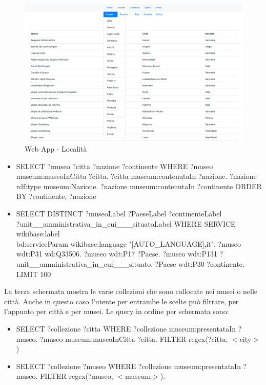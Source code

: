 \documentclass[12pt]{article}
\begin{document}
\begin{figure}[!h]
   \centering
   \includegraphics[scale=0.30]{fig/Schermata 2 webapp.png}
   \caption{Web App - Località}\label{fig:picture}
\end{figure}

\begin{itemize}
 \item SELECT ?museo ?citta ?nazione ?continente WHERE {?museo museum:museoInCitta ?citta. ?citta museum:contenutaIn ?nazione. ?nazione rdf:type museum:Nazione. ?nazione museum:contenutaIn ?continente} ORDER BY ?continente, ?nazione
 \item SELECT DISTINCT ?museoLabel ?PaeseLabel ?continenteLabel\\ ?unit\_\_amministrativa\_in\_cui\_\_\_situatoLabel WHERE { SERVICE wikibase:label\\ { bd:serviceParam wikibase:language "[AUTO\_LANGUAGE],it". } ?museo wdt:P31 wd:Q33506. ?museo wdt:P17 ?Paese. ?museo wdt:P131 ?unit\_\_amministrativa\_in\_cui\_\_\_situato. ?Paese wdt:P30 ?continente. } LIMIT 100
\end{itemize} 

La terza schermata mostra le varie collezioni che sono collocate nei musei o nelle città. Anche in questo caso l’utente per entrambe le scelte può filtrare, per l’appunto per città e per musei.
Le query in ordine per schermata sono:
\begin{itemize}
 \item SELECT ?collezione ?citta WHERE {?collezione museum:presentataIn ?museo. ?museo museum:museoInCitta ?citta. FILTER regex(?citta, $<$city$>$)}
 \item SELECT ?collezione ?museo WHERE { ?collezione museum:presentataIn ?museo.  FILTER regex(?museo, $<$museum$>$).}
\end{itemize} 
\end{document}
